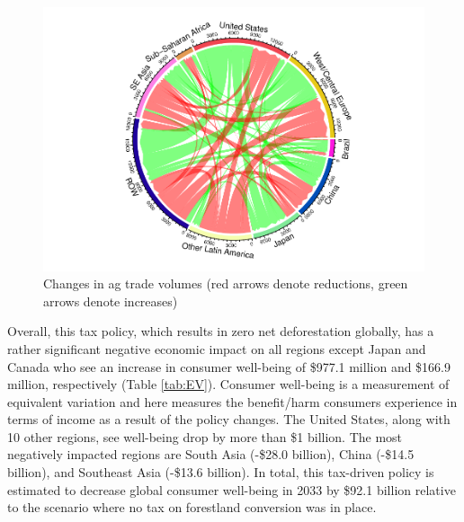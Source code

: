 \documentclass[
]{article}
\begin{document}
\begin{figure}
\centering
\includegraphics{paper_files/figure-latex/unnamed-chunk-5-1.pdf}
\caption{\label{fig:unnamed-chunk-5}Changes in ag trade volumes (red arrows denote reductions, green arrows denote increases)}
\end{figure}

Overall, this tax policy, which results in zero net deforestation globally, has a rather significant negative economic impact on all regions except Japan and Canada who see an increase in consumer well-being of \$977.1 million and \$166.9 million, respectively (Table \ref{tab:EV}). Consumer well-being is a measurement of equivalent variation and here measures the benefit/harm consumers experience in terms of income as a result of the policy changes. The United States, along with 10 other regions, see well-being drop by more than \$1 billion. The most negatively impacted regions are South Asia (-\$28.0 billion), China (-\$14.5 billion), and Southeast Asia (-\$13.6 billion). In total, this tax-driven policy is estimated to decrease global consumer well-being in 2033 by \$92.1 billion relative to the scenario where no tax on forestland conversion was in place.
\end{document}
